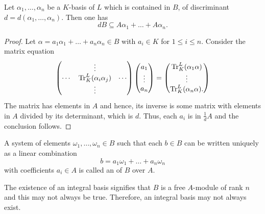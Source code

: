 \begin{lemma}
    Let $\alpha_1,\dots,\alpha_n$ be a $K$-basis of $L$ which is contained in $B$, of discriminant $d = d(\alpha_1,\dots,\alpha_n)$. Then one has 
    \begin{equation*}
        dB\subseteq A\alpha_1 + \dots + A\alpha_n.
    \end{equation*}
\end{lemma}
\begin{proof}
    Let $\alpha = a_1\alpha_1 + \dots + a_n\alpha_n\in B$ with $a_i\in K$ for $1\le i\le n$. Consider the matrix equation 
    \begin{equation*}
        \begin{pmatrix}
            & \vdots & \\
            \cdots & \operatorname{Tr}^L_K(\alpha_i\alpha_j) & \cdots \\
            & \vdots &
        \end{pmatrix}
        \begin{pmatrix}
            a_1\\\vdots\\a_n
        \end{pmatrix}
        = 
        \begin{pmatrix}
            \operatorname{Tr}^L_K(\alpha_1\alpha)\\\vdots\\\operatorname{Tr}^L_K(\alpha_n\alpha).
        \end{pmatrix}
    \end{equation*}
    The matrix has elements in $A$ and hence, its inverse is some matrix with elements in $A$ divided by its determinant, which is $d$. Thus, each $a_i$ is in $\frac{1}{d}A$ and the conclusion follows.
\end{proof}

\begin{definition}
    A system of elements $\omega_1,\dots,\omega_n\in B$ such that each $b\in B$ can be written uniquely as a linear combination 
    \begin{equation*}
        b = a_1\omega_1 + \dots + a_n\omega_n
    \end{equation*}
    with coefficients $a_i\in A$ is called an  of $B$ over $A$.
\end{definition}

\begin{remark}
    The existence of an integral basis signifies that $B$ is a free $A$-module of rank $n$ and this may not always be true. Therefore, an integral basis may not always exist. 
\end{remark}

